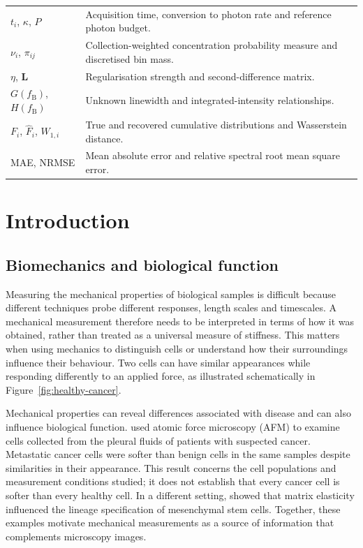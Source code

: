 \documentclass[11pt]{article}
\begin{document}
\begin{longtable}{@{}p{}p{}@{}}
$t_i$, $\kappa$, $P$ & Acquisition time, conversion to photon rate and reference photon budget. \\
$\nu_i$, $\pi_{ij}$ & Collection-weighted concentration probability measure and discretised bin mass. \\
$\eta$, $\mathbf L$ & Regularisation strength and second-difference matrix. \\
$G(f_{\mathrm B})$, $H(f_{\mathrm B})$ & Unknown linewidth and integrated-intensity relationships. \\
$F_i$, $\widehat F_i$, $W_{1,i}$ & True and recovered cumulative distributions and Wasserstein distance. \\
MAE, NRMSE & Mean absolute error and relative spectral root mean square error. \\
\bottomrule
\end{longtable}
\normalsize\clearpage\tableofcontents\clearpage

\section{Introduction}
\label{sec:introduction}
\subsection{Biomechanics and biological function}

Measuring the mechanical properties of biological samples is difficult because different techniques probe different responses, length scales and timescales. A mechanical measurement therefore needs to be interpreted in terms of how it was obtained, rather than treated as a universal measure of stiffness. This matters when using mechanics to distinguish cells or understand how their surroundings influence their behaviour. Two cells can have similar appearances while responding differently to an applied force, as illustrated schematically in Figure~\ref{fig:healthy-cancer}.

Mechanical properties can reveal differences associated with disease and can also influence biological function. \citet{cross2007} used atomic force microscopy (AFM) to examine cells collected from the pleural fluids of patients with suspected cancer. Metastatic cancer cells were softer than benign cells in the same samples despite similarities in their appearance. This result concerns the cell populations and measurement conditions studied; it does not establish that every cancer cell is softer than every healthy cell. In a different setting, \citet{engler2006} showed that matrix elasticity influenced the lineage specification of mesenchymal stem cells. Together, these examples motivate mechanical measurements as a source of information that complements microscopy images.
\end{document}
